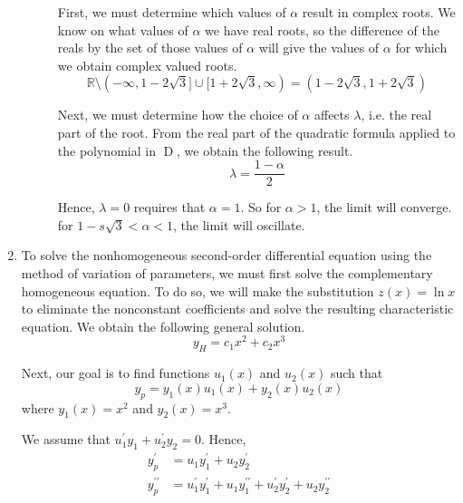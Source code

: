 \documentclass[letterpaper,11pt]{article}
\DeclareMathOperator{\D}{D}
\newcommand{\R}{\mathbb{R}}
\begin{document}
\begin{enumerate}
\begin{description}
                First, we must determine which values of $\alpha$ result in
                complex roots. We know on what values of $\alpha$ we have real
                roots, so the difference of the reals by the set of those
                values of $\alpha$ will give the values of $\alpha$ for which
                we obtain complex valued roots.
                \begin{equation*}
                    \R \setminus
                    (-\infty, 1 - 2 \sqrt 3]
                    \cup
                    [1 + 2 \sqrt 3, \infty)
                    =
                    (1 - 2 \sqrt 3, 1 + 2 \sqrt 3)
                \end{equation*}

                Next, we must determine how the choice of $\alpha$ affects
                $\lambda$, i.e. the real part of the root. From the real part
                of the quadratic formula applied to the polynomial in $\D{}$,
                we obtain the following result.
                \begin{equation*}
                    \lambda = \frac{1 - \alpha}{2}
                \end{equation*}

                Hence, $\lambda = 0$ requires that $\alpha = 1$. So for
                $\alpha > 1$, the limit will converge. for
                $1 - s \sqrt 3 < \alpha < 1$, the limit will oscillate.
        \end{description}

    \item
        To solve the nonhomogeneous second-order differential equation using
        the method of variation of parameters, we must first solve the
        complementary homogeneous equation. To do so, we will make the
        substitution $z(x) = \ln x$ to eliminate the nonconstant coefficients
        and solve the resulting characteristic equation. We obtain the
        following general solution.
        \begin{equation*}
            y_H = c_1 x^2 + c_2 x^3
        \end{equation*}

        Next, our goal is to find functions $u_1(x)$ and $u_2(x)$ such that
        \begin{equation*}
            y_p = y_1(x) u_1(x) + y_2(x) u_2(x)
        \end{equation*}
        where $y_1(x) = x^2$ and $y_2(x) = x^3$.

        We assume that $u_1^\prime y_1 + u_2^\prime y_2 = 0$. Hence,
        \begin{align*}
            y_p^\prime &= u_1 y_1^\prime + u_2 y_2^\prime \\
            y_p^{\prime\prime}
            &= u_1^\prime y_1^\prime + u_1 y_1^{\prime\prime}
            + u_2^\prime y_2^\prime + u_2 y_2^{\prime\prime}
        \end{align*}


\end{enumerate}
\end{document}
